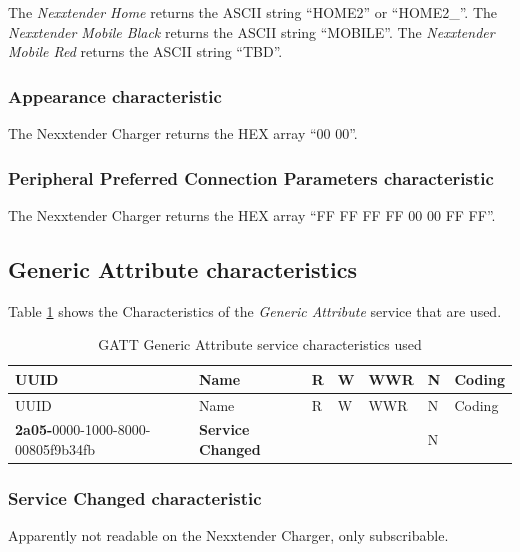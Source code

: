 \documentclass[a4paper]{article}
\begin{document}
The \emph{Nexxtender Home} returns the ASCII string ``HOME2'' or  ``HOME2\_''.
The \emph{Nexxtender Mobile Black} returns the ASCII string ``MOBILE''.
The \emph{Nexxtender Mobile Red} returns the ASCII string ``TBD''.

\subsubsection{Appearance characteristic}
\label{appearance_characteristic}

The Nexxtender Charger returns the HEX array ``00 00''.

\subsubsection{Peripheral Preferred Connection Parameters characteristic}
\label{peripheral_preferred_connection_parameters_characteristic}

The Nexxtender Charger returns the HEX array ``FF FF FF FF 00 00 FF FF''.

\subsection{Generic Attribute characteristics}
\label{generic_attribute_characteristics}

Table \ref{table.7} shows the Characteristics of the \emph{Generic Attribute} service that are used.

\begin{longtable}[]{@{}lllllll@{}}
	\caption{GATT Generic Attribute service characteristics used}
	\label{table.7}
	\tabularnewline
	\toprule\noalign{}
	UUID & Name & R & W & WWR & N & Coding \\
	\midrule\noalign{}
	\endfirsthead
	\toprule\noalign{}
	UUID & Name & R & W & WWR & N & Coding \\
	\midrule\noalign{}
	\endhead
	\bottomrule\noalign{}
	\endlastfoot
	0000\textbf{2a05-}0000-1000-8000-00805f9b34fb & \textbf{Service Changed}
	& & & & N & \\
\end{longtable}

\subsubsection{Service Changed characteristic}
\label{service_changed_characteristic}

Apparently not readable on the Nexxtender Charger, only subscribable.
\end{document}
